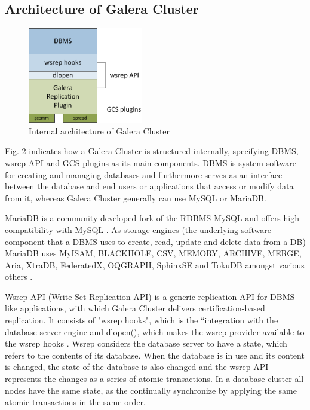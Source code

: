\documentclass{sig-alternate}
\begin{document}
\subsection{Architecture of Galera Cluster}

\begin{figure}[h]
\centering
\includegraphics[width=5cm]{galera2.png}
\caption{Internal architecture of Galera Cluster \cite{wsrepapi}}
\end{figure}

Fig. 2 indicates how a Galera Cluster is structured internally, specifying DBMS, wsrep API and GCS plugins as its main components. DBMS is system software for creating and managing databases and furthermore serves as an interface between the database and end users or applications that access or modify data from it, whereas Galera Cluster generally can use MySQL or MariaDB.

MariaDB is a community-developed fork of the RDBMS MySQL and offers high compatibility with MySQL \cite{aboutmariadb}. As storage engines (the underlying software component that a DBMS uses to create, read, update and delete data from a DB) MariaDB uses MyISAM, BLACKHOLE, CSV, MEMORY, ARCHIVE, MERGE, Aria, XtraDB, FederatedX, OQGRAPH, SphinxSE and TokuDB amongst various others \cite{mariadbengines}.

Wsrep API (Write-Set Replication API) is a generic replication API for DBMS-like applications, with which Galera Cluster delivers certification-based replication. It consists of "wsrep hooks", which is the “integration with the database server engine and dlopen(), which makes the wsrep provider available to the wsrep hooks \cite{wsrepapi}. Wsrep considers the database server to have a state, which refers to the contents of its database. When the database is in use and its content is changed, the state of the database is also changed and the wsrep API represents the changes as a series of atomic transactions. In a database cluster all nodes have the same state, as the continually synchronize by applying the same atomic transactions in the same order.
\end{document}
